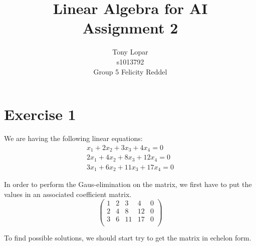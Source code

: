 \documentclass[a4paper]{article}
\title{Linear Algebra for AI\\Assignment 2}
\author{Tony Lopar \\ s1013792 \\ Group 5 \quad Felicity Reddel}
\begin{document}
\maketitle

\section*{Exercise 1}
We are having the following linear equations: \\
\begin{align*}
x_1 + 2x_2 + 3x_3 + 4x_4 = 0 \\
2x_1 + 4x_2 + 8x_3 + 12x_4 = 0 \\
3x_1 + 6x_2 + 11x_3 + 17x_4 = 0
\end{align*}

In order to perform the Gaus-elimination on the matrix, we first have to put the values in an associated coefficient matrix.
\[
\left(
\begin{array}{cccc|c}
1 & 2 & 3 & 4 & 0   \\
2 & 4 & 8 & 12 & 0  \\
3 & 6 & 11 & 17 & 0 \\
\end{array}
\right)
\]

To find possible solutions, we should start try to get the matrix in echelon form.
\end{document}
